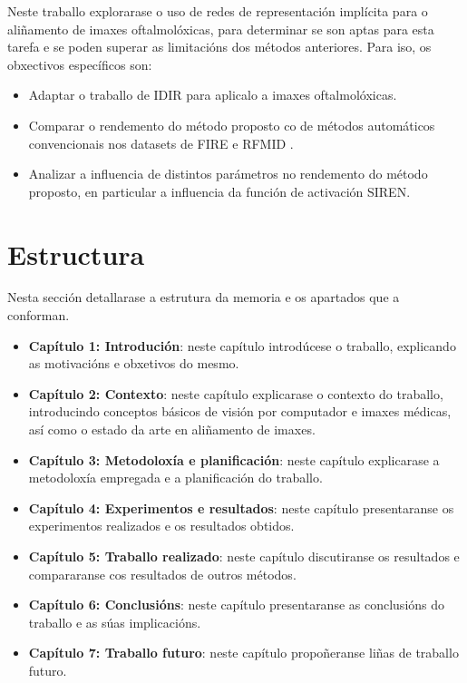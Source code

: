 Neste traballo explorarase o uso de redes de representación implícita para o aliñamento de imaxes oftalmolóxicas, para determinar se son aptas para esta tarefa e se poden superar as limitacións dos métodos anteriores.
Para iso, os obxectivos específicos son:
\begin{itemize}
    \item Adaptar o traballo de IDIR \cite{wolterink2021implicit} para aplicalo a imaxes oftalmolóxicas.
    \item Comparar o rendemento do método proposto co de métodos automáticos convencionais nos datasets de FIRE \cite{FIRE} e RFMID \cite{RFMiD}.
    \item Analizar a influencia de distintos parámetros no rendemento do método proposto, en particular a influencia da función de activación SIREN.
\end{itemize}

\section{Estructura }

Nesta sección detallarase a estrutura da memoria e os apartados que a conforman.

\begin{itemize}
    \item \textbf{Capítulo 1: Introdución}: neste capítulo introdúcese o traballo, explicando as motivacións e obxetivos do mesmo.
    \item \textbf{Capítulo 2: Contexto}: neste capítulo explicarase o contexto do traballo, introducindo conceptos básicos de visión por computador e imaxes médicas, así como o estado da arte en aliñamento de imaxes.
    \item \textbf{Capítulo 3: Metodoloxía e planificación}: neste capítulo explicarase a metodoloxía empregada e a planificación do traballo.
    \item \textbf{Capítulo 4: Experimentos e resultados}: neste capítulo presentaranse os experimentos realizados e os resultados obtidos.
    \item \textbf{Capítulo 5: Traballo realizado}: neste capítulo discutiranse os resultados e compararanse cos resultados de outros métodos.
    \item \textbf{Capítulo 6: Conclusións}: neste capítulo presentaranse as conclusións do traballo e as súas implicacións.
    \item \textbf{Capítulo 7: Traballo futuro}: neste capítulo propoñeranse liñas de traballo futuro.
\end{itemize}
